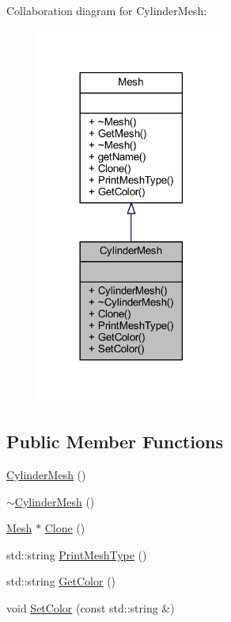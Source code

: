 Collaboration diagram for Cylinder\+Mesh\+:
\nopagebreak
\begin{figure}[H]
\begin{center}
\leavevmode
\includegraphics[width=177pt]{class_cylinder_mesh__coll__graph}
\end{center}
\end{figure}
\subsection*{Public Member Functions}
\begin{DoxyCompactItemize}
\item 
\mbox{\hyperlink{class_cylinder_mesh_a08927de34b86bf63103f8c3790ccf870}{Cylinder\+Mesh}} ()
\item 
\mbox{\hyperlink{class_cylinder_mesh_a0da5f97347f977bd0783f6674db3cba0}{$\sim$\+Cylinder\+Mesh}} ()
\item 
\mbox{\hyperlink{class_mesh}{Mesh}} $\ast$ \mbox{\hyperlink{class_cylinder_mesh_ad9e278dd523b06090b4e64f70a262575}{Clone}} ()
\item 
std\+::string \mbox{\hyperlink{class_cylinder_mesh_aa5edae04a31b3ccab1e051eba25781a7}{Print\+Mesh\+Type}} ()
\item 
std\+::string \mbox{\hyperlink{class_cylinder_mesh_a7415f90e56862321e09bcf6088a335a0}{Get\+Color}} ()
\item 
void \mbox{\hyperlink{class_cylinder_mesh_a892088bc6375fbee9a80b2022b05ea03}{Set\+Color}} (const std\+::string \&)
\end{DoxyCompactItemize}



